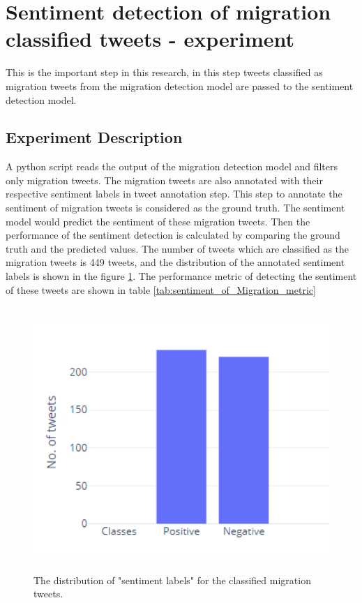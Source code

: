 \section{Sentiment detection of migration classified tweets - experiment} \label{ssssenti}


This is the important step in this research, in this step tweets classified as migration tweets from the migration detection model are passed to the sentiment detection model.

\subsection{Experiment Description}

A python script reads the output of the migration detection model and filters only migration tweets. The migration tweets are also annotated with their respective sentiment labels in tweet annotation step. This step to annotate the sentiment of migration tweets is considered as the ground truth. The sentiment model would predict the sentiment of these migration tweets. Then the performance of the sentiment detection is calculated by comparing the ground truth and the predicted values. The number of tweets which are classified as the migration tweets is 449 tweets, and the distribution of the annotated sentiment labels is shown in the figure \ref{fig:sent_migration_distribution}. The performance metric of detecting the sentiment of these tweets are shown in table \ref{tab:sentiment_of_Migration_metric}

 

\begin{figure}
	\centering
	\includegraphics[width=12cm\linewidth,height=10cm]{thesis_template/images/sentiment_of_migration_tweets.png}
	\caption{ The distribution of "sentiment labels" for the classified migration tweets.}
	\label{fig:sent_migration_distribution}
\end{figure}


